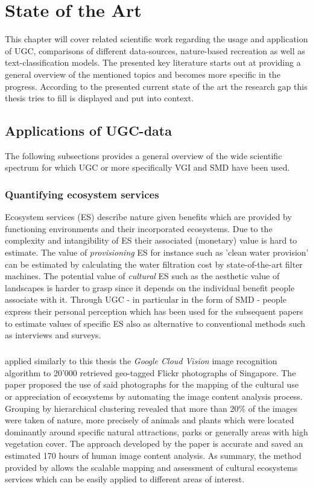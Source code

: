 \chapter{State of the Art} \label{state_of_the_art}
This chapter will cover related scientific work regarding the usage and application of UGC, comparisons of different data-sources, nature-based recreation as well as text-classification models. The presented key literature starts out at providing a general overview of the mentioned topics and becomes more specific in the progress. According to the presented current state of the art the research gap this thesis tries to fill is displayed and put into context.

\section{Applications of UGC-data}
The following subsections provides a general overview of the wide scientific spectrum for which UGC or more specifically VGI and SMD have been used.

\subsection{Quantifying ecosystem services}
Ecosystem services (ES) describe nature given benefits which are provided by functioning environments and their incorporated ecosystems. Due to the complexity and intangibility of ES their associated (monetary) value is hard to estimate. The value of \textit{provisioning} ES for instance such as 'clean water provision' can be estimated by calculating the water filtration cost by state-of-the-art filter machines. The potential value of \textit{cultural} ES such as the aesthetic value of landscapes is harder to grasp since it depends on the individual benefit people associate with it. Through UGC - in particular in the form of SMD - people express their personal perception which has been used for the subsequent papers to estimate values of specific ES also as alternative to conventional methods such as interviews and surveys.  
\paragraph*{\textcite{Richards2018}} applied similarly to this thesis the \textit{Google Cloud Vision} image recognition algorithm to 20'000 retrieved geo-tagged Flickr photographs of Singapore. The paper proposed the use of said photographs for the mapping of the cultural use or appreciation of ecosystems by automating the image content analysis process. Grouping by hierarchical clustering revealed that more than 20\% of the images were taken of nature, more precisely of animals and plants which were located dominantly around specific natural attractions, parks or generally areas with high vegetation cover. The approach developed by the paper is accurate and saved an estimated 170 hours of human image content analysis. As summary, the method provided by \textcite{Richards2018} allows the scalable mapping and assessment of cultural ecosystems services which can be easily applied to different areas of interest.

